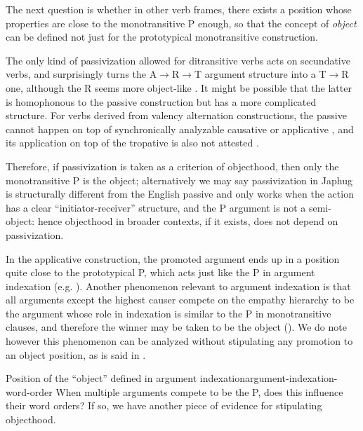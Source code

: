 \documentclass[a4paper, oneside, 12pt]{report}
\newcommand*{\textto}{$\to$}
\newcommand*{\citesec}[1]{\S~{#1}}
\newcommand*{\citepage}[1]{p.~{#1}}
\newcommand*{\term}[1]{\emph{#1}}
\begin{document}
The next question is whether in other verb frames,
there exists a position whose properties are close to the monotransitive P enough,
so that the concept of \term{object} can be defined not just for 
the prototypical monotransitive construction. 

The only kind of passivization allowed for ditransitive verbs
acts on secundative verbs,
and surprisingly turns the A\textto R\textto T argument structure
into a T\textto R one, although the R seems more object-like
\citep[\citepage{884}]{jacques2021grammar}.
It might be possible that the latter is homophonous to the passive construction
but has a more complicated structure.
For verbs derived from valency alternation constructions,
the passive cannot happen on top of synchronically analyzable causative or applicative 
\citep[\citepage{885}]{jacques2021grammar},
and its application on top of the tropative is also not attested
\citep[\citesec{17.5.4}]{jacques2021grammar}.

Therefore, if passivization is taken as a criterion of objecthood,
then only the monotransitive P is the object;
alternatively we may say passivization in Japhug
is structurally different from the English passive
and only works when the action has a clear ``initiator-receiver'' structure,
and the P argument is not a semi-object:
hence objecthood in broader contexts, if it exists,
does not depend on passivization.

In the applicative construction,
the promoted argument ends up in a position quite close to the prototypical P,
which acts just like the P in argument indexation
(e.g. \citealt[\citepage{863}, (102)]{jacques2021grammar}).
Another phenomenon relevant to argument indexation is that
all arguments except the highest causer compete on the empathy hierarchy
to be the argument whose role in indexation is similar to the P in monotransitive clauses,
and therefore the winner may be taken to be the object
().
We do note however this phenomenon can be analyzed without stipulating 
any promotion to an object position,
as is said in .

\begin{todobox}{Position of the ``object'' defined in argument indexation}{argument-indexation-word-order}
    When multiple arguments compete to be the P,
    does this influence their word orders?
    If so, we have another piece of evidence for stipulating objecthood.
\end{todobox}
\end{document}
